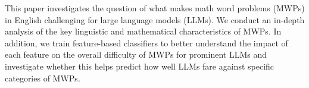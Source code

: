 This paper investigates the question of what makes math word problems (MWPs) in English challenging for large language models (LLMs). We conduct an in-depth analysis of the key linguistic and mathematical characteristics of MWPs. In addition, we train feature-based classifiers to better understand the impact of each feature on the overall difficulty of MWPs for prominent LLMs and investigate whether this helps predict how well LLMs fare against specific categories of MWPs.